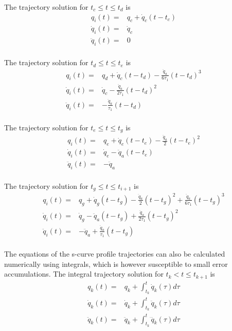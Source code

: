 The trajectory solution for $t_c \leq t \leq t_d$ is
\begin{equation}
\begin{aligned}
q_i(t) ={}& q_c + \dot{q}_c(t-t_c) \\
\dot{q}_i(t) ={}& \dot{q}_c \\
\ddot{q}_i(t) ={}& 0 \\
\end{aligned}
\end{equation}

The trajectory solution for $t_d \leq t \leq t_e$ is
\begin{equation}
\begin{aligned}
q_i(t) ={}& q_d + \dot{q}_c(t-t_d) - \frac{\ddot{q}_a}{6τ_1}(t-t_d)^3 \\
\dot{q}_i(t) ={}& \dot{q}_c - \frac{\ddot{q}_a}{2τ_1}(t-t_d)^2 \\
\ddot{q}_i(t) ={}& -\frac{\ddot{q}_a}{τ_1}(t-t_d) \\
\end{aligned}
\end{equation}

The trajectory solution for $t_e \leq t \leq t_g$ is
\begin{equation}
\begin{aligned}
q_i(t) ={}& q_e + \dot{q}_e(t-t_e) - \frac{\ddot{q}_a}{2}(t-t_e)^2 \\
\dot{q}_i(t) ={}& \dot{q}_e - \ddot{q}_a(t-t_e) \\
\ddot{q}_i(t) ={}& -\ddot{q}_a \\
\end{aligned}
\end{equation}

The trajectory solution for $t_g \leq t \leq t_{i+1}$ is
\begin{equation}
\begin{aligned}
q_i(t) ={}& q_g + \dot{q}_g(t-t_g) - \frac{\ddot{q}_a}{2}(t-t_g)^2 + \frac{\ddot{q}_a}{6τ_1}(t-t_g)^3 \\
\dot{q}_i(t) ={}& \dot{q}_g - \ddot{q}_a(t-t_g) + \frac{\ddot{q}_a}{2τ_1}(t-t_g)^2 \\
\ddot{q}_i(t) ={}& -\ddot{q}_a + \frac{\ddot{q}_a}{τ_1}(t-t_g) \\
\end{aligned}
\end{equation}

The equations of the s-curve profile trajectories can also be calculated numerically using integrals, which is however susceptible to small error accumulations. The integral trajectory solution for 
$t_k < t \leq t_{k+1}$ is
\begin{equation}
\begin{aligned}
q_k(t) ={}& q_k + \int_{t_k}^t \dot{q}_k(τ)dτ \\
\dot{q}_k(t) ={}& \dot{q}_k + \int_{t_k}^t \ddot{q}_k(τ)dτ \\
\ddot{q}_k(t) ={}& \ddot{q}_k + \int_{t_k}^t \dddot{q}_k(τ)dτ \\
\end{aligned}
\end{equation}

